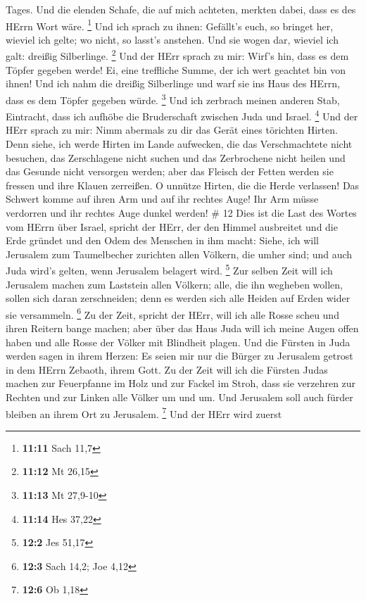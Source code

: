 Tages. Und die elenden Schafe, die auf mich achteten, merkten dabei,
dass es des HErrn Wort wäre. \footnote{\textbf{11:11} Sach 11,7}
 Und ich sprach zu ihnen: Gefällt's euch, so bringet her,
wieviel ich gelte; wo nicht, so lasst's anstehen. Und sie wogen dar,
wieviel ich galt: dreißig Silberlinge. \footnote{\textbf{11:12} Mt 26,15}
 Und der HErr sprach zu mir: Wirf's hin, dass es dem Töpfer
gegeben werde! Ei, eine treffliche Summe, der ich wert geachtet bin von
ihnen! Und ich nahm die dreißig Silberlinge und warf sie ins Haus des
HErrn, dass es dem Töpfer gegeben würde. \footnote{\textbf{11:13} Mt
  27,9-10}  Und ich zerbrach meinen anderen Stab,
Eintracht, dass ich aufhöbe die Bruderschaft zwischen Juda und Israel.
\footnote{\textbf{11:14} Hes 37,22}  Und der HErr sprach zu
mir: Nimm abermals zu dir das Gerät eines törichten Hirten.
 Denn siehe, ich werde Hirten im Lande aufwecken, die das
Verschmachtete nicht besuchen, das Zerschlagene nicht suchen und das
Zerbrochene nicht heilen und das Gesunde nicht versorgen werden; aber
das Fleisch der Fetten werden sie fressen und ihre Klauen zerreißen.
 O unnütze Hirten, die die Herde verlassen! Das Schwert
komme auf ihren Arm und auf ihr rechtes Auge! Ihr Arm müsse verdorren
und ihr rechtes Auge dunkel werden! \# 12  Dies ist die Last
des Wortes vom HErrn über Israel, spricht der HErr, der den Himmel
ausbreitet und die Erde gründet und den Odem des Menschen in ihm macht:
 Siehe, ich will Jerusalem zum Taumelbecher zurichten allen
Völkern, die umher sind; und auch Juda wird's gelten, wenn Jerusalem
belagert wird. \footnote{\textbf{12:2} Jes 51,17}  Zur
selben Zeit will ich Jerusalem machen zum Laststein allen Völkern; alle,
die ihn wegheben wollen, sollen sich daran zerschneiden; denn es werden
sich alle Heiden auf Erden wider sie versammeln. \footnote{\textbf{12:3}
  Sach 14,2; Joe 4,12}  Zu der Zeit, spricht der HErr, will
ich alle Rosse scheu und ihren Reitern bange machen; aber über das Haus
Juda will ich meine Augen offen haben und alle Rosse der Völker mit
Blindheit plagen.  Und die Fürsten in Juda werden sagen in
ihrem Herzen: Es seien mir nur die Bürger zu Jerusalem getrost in dem
HErrn Zebaoth, ihrem Gott.  Zu der Zeit will ich die Fürsten
Judas machen zur Feuerpfanne im Holz und zur Fackel im Stroh, dass sie
verzehren zur Rechten und zur Linken alle Völker um und um. Und
Jerusalem soll auch fürder bleiben an ihrem Ort zu Jerusalem.
\footnote{\textbf{12:6} Ob 1,18}  Und der HErr wird zuerst
